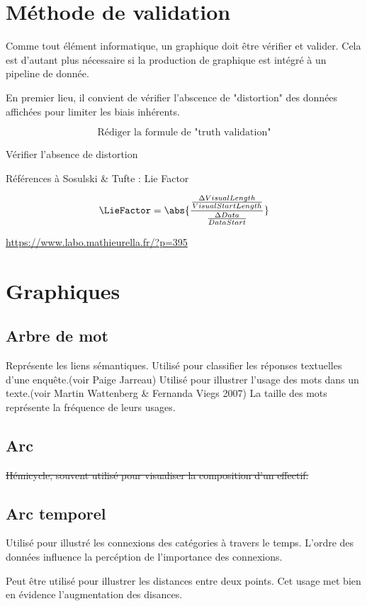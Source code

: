\documentclass[a4paper,12pt]{article}
\begin{document}
\begin{multicols}{2}
\section*{Méthode de validation}
\label{sec:org77c7aee}
Comme tout élément informatique, un graphique doit être vérifier et valider. Cela est d'autant plus nécessaire si la production de graphique est intégré à un pipeline de donnée.

En premier lieu, il convient de vérifier l'abscence de "distortion" des données affichées pour limiter les biais inhérents.\autocite{stephenfewGeneralGraphDesign2012}

$$\text{Rédiger la formule de "truth validation"}$$

Vérifier l'absence de distortion

Références à Sosulski \& Tufte : Lie Factor

$$\LieFactor=\abs{\frac{\frac{\Delta VisualLength}{VisualStartLength}}{\frac{\Delta Data}{DataStart}}}$$

\url{https://www.labo.mathieurella.fr/?p=395}
\section*{Graphiques}
\label{sec:org1c60886}
\subsection*{Arbre de mot}
\label{sec:org3dc3706}
Représente les liens sémantiques. Utilisé pour classifier les réponses textuelles d'une enquête.(voir Paige Jarreau) Utilisé pour illustrer l'usage des mots dans un texte.(voir Martin Wattenberg \& Fernanda Viegs 2007) La taille des mots représente la fréquence de leurs usages. \autocite{jonathanschwabishQualitative2021}
\subsection*{Arc}
\label{sec:org0d1f8fd}
\sout{Hémicycle, souvent utilisé pour visualiser la composition d'un effectif.}
\subsection*{Arc temporel}
\label{sec:org27dd163}
Utilisé pour illustré les connexions des catégories à travers le temps. L'ordre des données influence la percéption de l'importance des connexions. \autocite{jonathanschwabishRelationship2021}

Peut être utilisé pour illustrer les distances entre deux points. Cet usage met bien en évidence l'augmentation des disances. \autocite{jonathanschwabishRelationship2021}

\end{multicols}
\end{document}
